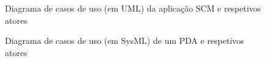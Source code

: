 \documentclass[12pt,a4paper]{article}
\begin{document}
\begin{landscape}
  \begin{figure}
    \centering
    
    \caption{Diagrama de casos de uso (em UML) da aplicação SCM e respetivos atores}
    \label{fig:uml1}
  \end{figure}
\end{landscape}

%     
%
%     

\begin{landscape}
  \begin{figure}
    \centering
    
    \caption{Diagrama de casos de uso (em SysML) de um PDA e respetivos atores}
    \label{fig:sysml1}
  \end{figure}
\end{landscape}

%     
%
%     
\end{document}
